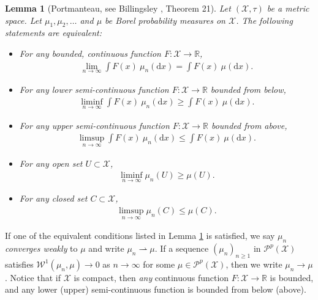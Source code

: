 \documentclass[11pt,reqno]{amsart}
\numberwithin{equation}{section}
\newtheorem{lemma}[thm]{Lemma}
\theoremstyle{definition}
\begin{document}
\begin{lemma}[Portmanteau, see Billingsley \cite{billingsley99}, Theorem 21] \label{portmanteau}
Let $({\mathcal{X}},\tau)$ be a metric space.
Let $\mu_1,\mu_2,\dots$ and $\mu$ be Borel probability measures on ${\mathcal{X}}$.
The following statements are equivalent:
\begin{itemize}
\item[(a)] For any bounded, continuous function $F : {\mathcal{X}} \to {\mathbb{R}}$, 
{\begin{align*} {
\lim_{n \to \infty} \int F(x)\ \mu_n({\mathrm{d}} x) = \int F(x)\ \mu({\mathrm{d}} x).
} \end{align*}}
\item[(b)] For any lower semi-continuous function $F: {\mathcal{X}} \to {\mathbb{R}}$ bounded from below,
{\begin{align*} {
\liminf_{n \to \infty} \int F(x)\ \mu_n({\mathrm{d}} x) \geq \int F(x)\ \mu({\mathrm{d}} x).
} \end{align*}}
\item[(c)] For any upper semi-continuous function $F: {\mathcal{X}} \to {\mathbb{R}}$ bounded from above,
{\begin{align*} {
\limsup_{n \to \infty} \int F(x)\ \mu_n({\mathrm{d}} x) \leq \int F(x)\ \mu({\mathrm{d}} x).
} \end{align*}}
\item[(d)] For any open set $U \subset {\mathcal{X}}$,
{\begin{align*} {
\liminf_{n \to \infty} \mu_n(U) \geq \mu(U).
} \end{align*}}
\item[(e)] For any closed set $C \subset {\mathcal{X}}$,
{\begin{align*} {
\limsup_{n \to \infty} \mu_n(C) \leq \mu(C).
} \end{align*}}
\end{itemize}
\end{lemma}

If one of the equivalent conditions listed in Lemma \ref{portmanteau} is satisfied, we say $\mu_n$ \textit{converges weakly} to $\mu$ and write $\mu_n \rightharpoonup \mu$.
If a sequence $(\mu_n)_{n \geq 1}$ in ${\mathcal{P}}^p({\mathcal{X}})$ satisfies ${\mathcal{W}}^1(\mu_n,\mu) \to 0$ as $n \to \infty$ for some $\mu \in {\mathcal{P}}^p({\mathcal{X}})$, then we write $\mu_n \to \mu$.
Notice that if ${\mathcal{X}}$ is compact, then \textit{any} continuous function $F : {\mathcal{X}} \to {\mathbb{R}}$ is bounded, and any lower (upper) semi-continuous function is bounded from below (above).
\end{document}
